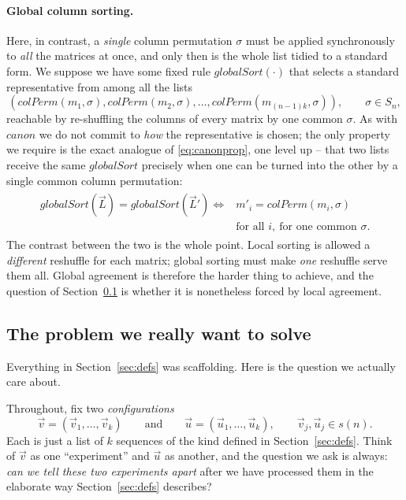 \paragraph{Global column sorting.}
Here, in contrast, a \emph{single} column permutation $\sigma$ must be applied
synchronously to \emph{all} the matrices at once, and only then is the whole list
tidied to a standard form.  We suppose we have some fixed rule $globalSort(\cdot)$
that selects a standard representative from among all the lists
$$
\left(
colPerm(m_1, \sigma), colPerm(m_2, \sigma), \ldots, colPerm(m_{(n-1)k},\sigma)
\right),
\qquad \sigma\in S_n,
$$
reachable by re-shuffling the columns of every matrix by one common $\sigma$.  As
with $canon$ we do not commit to \emph{how} the representative is chosen; the only
property we require is the exact analogue of \eqref{eq:canonprop}, one level up --
that two lists receive the same $globalSort$ precisely when one can be turned into
the other by a single common column permutation:
\begin{align}
\begin{split}
globalSort(\vec L)=globalSort(\vec L')
\iff{}& m'_i=colPerm(m_i,\sigma)\\[-2pt]
& \text{for all }i,\ \text{for one common }\sigma.
\end{split}
\label{eq:globalprop}
\end{align}
The contrast between the two is the whole point.  Local sorting is allowed a
\emph{different} reshuffle for each matrix; global sorting must make \emph{one}
reshuffle serve them all.  Global agreement is therefore the harder thing to
achieve, and the question of Section~\ref{sec:problem} is whether it is nonetheless
forced by local agreement.


\subsection{The problem we really want to solve}
\label{sec:problem}

Everything in Section~\ref{sec:defs} was scaffolding.  Here is the question we actually
care about.

\label{def:config}Throughout, fix two \emph{configurations}
\[
\vec v=(\vec v_1,\ldots,\vec v_k)
\qquad\text{and}\qquad
\vec u=(\vec u_1,\ldots,\vec u_k),
\qquad \vec v_j,\vec u_j\in s(n).
\]
Each is just a list of $k$ sequences of the kind defined in Section~\ref{sec:defs}.  Think of
$\vec v$ as one ``experiment'' and $\vec u$ as another, and the question we ask is
always: \emph{can we tell these two experiments apart} after we have processed
them in the elaborate way Section~\ref{sec:defs} describes?

